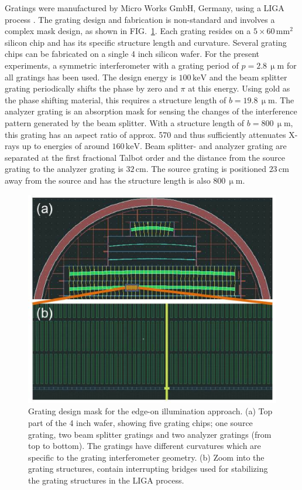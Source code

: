 \documentclass[aip,apl,amsmath,amssymb,floatfix,reprint,a4paper]{revtex4-1}
\newcommand{\unit}[1]{\ensuremath{\, \mathrm{#1}}}
\begin{document}
Gratings were manufactured by Micro Works GmbH, Germany, using a LIGA process \cite{Kenntner2010}. The grating design and fabrication is non-standard and involves a complex mask design, as shown in FIG.~\ref{Fig:grating_mask}. Each grating resides on a $5 \times 60 \unit{mm^2}$ silicon chip and has its specific structure length and curvature. Several grating chips can be fabricated on a single 4 inch silicon wafer. For the present experiments, a symmetric interferometer with a grating period of $p = 2.8 \unit{\upmu m}$ for all gratings has been used. The design energy is $100 \unit{keV}$ and the beam splitter grating periodically shifts the phase by zero and $\pi$ at this energy. Using gold as the phase shifting material, this requires a structure length of $b = 19.8 \unit{\upmu m}$. The analyzer grating is an absorption mask for sensing the changes of the interference pattern generated by the beam splitter. With a structure length of $b = 800 \unit{\upmu m}$, this grating has an aspect ratio of approx. 570 and thus sufficiently attenuates X-rays up to energies of around $160 \unit{keV}$. Beam splitter- and analyzer grating are separated at the first fractional Talbot order and the distance from the source grating to the analyzer grating is $32 \unit{cm}$. The source grating is positioned $23 \unit{cm}$ away from the source and has the structure length is also  $800 \unit{\upmu m}$.
\begin{figure} [ht]
  \includegraphics[width = \linewidth]{figures/grating_mask.eps}
  \caption{Grating design mask for the edge-on illumination approach. (a) Top part of the 4 inch wafer, showing five grating chips; one source grating, two beam splitter gratings and two analyzer gratings (from top to bottom). The gratings have different curvatures which are specific to the grating interferometer geometry. (b) Zoom into the grating structures, contain interrupting bridges used for stabilizing the grating structures in the LIGA process.}
  \label{Fig:grating_mask}
\end{figure}
\end{document}
